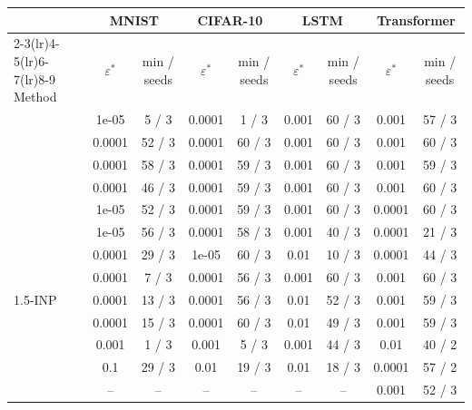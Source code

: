 \begin{tabular}{l cc cc cc cc}
\toprule
 & \multicolumn{2}{c}{MNIST} & \multicolumn{2}{c}{CIFAR-10} & \multicolumn{2}{c}{LSTM} & \multicolumn{2}{c}{Transformer} \\
\cmidrule(lr){2-3}\cmidrule(lr){4-5}\cmidrule(lr){6-7}\cmidrule(lr){8-9}
Method & $\varepsilon^\ast$ & min / seeds & $\varepsilon^\ast$ & min / seeds & $\varepsilon^\ast$ & min / seeds & $\varepsilon^\ast$ & min / seeds \\
\midrule
\BP{} & 1e-05 & 5 / 3 & 0.0001 & 1 / 3 & 0.001 & 60 / 3 & 0.001 & 57 / 3 \\
\SPSA{} & 0.0001 & 52 / 3 & 0.0001 & 60 / 3 & 0.001 & 60 / 3 & 0.001 & 60 / 3 \\
\SPSAb{} & 0.0001 & 58 / 3 & 0.0001 & 59 / 3 & 0.001 & 60 / 3 & 0.001 & 59 / 3 \\
\RS{} & 0.0001 & 46 / 3 & 0.0001 & 59 / 3 & 0.001 & 60 / 3 & 0.001 & 60 / 3 \\
\NP{} & 1e-05 & 52 / 3 & 0.0001 & 59 / 3 & 0.001 & 60 / 3 & 0.0001 & 60 / 3 \\
\ANP{} & 1e-05 & 56 / 3 & 0.0001 & 58 / 3 & 0.001 & 40 / 3 & 0.0001 & 21 / 3 \\
\ANPb{} & 0.0001 & 29 / 3 & 1e-05 & 60 / 3 & 0.01 & 10 / 3 & 0.0001 & 44 / 3 \\
\INP{} & 0.0001 & 7 / 3 & 0.0001 & 56 / 3 & 0.001 & 60 / 3 & 0.001 & 60 / 3 \\
1.5-INP & 0.0001 & 13 / 3 & 0.0001 & 56 / 3 & 0.01 & 52 / 3 & 0.001 & 59 / 3 \\
\DUST{} & 0.0001 & 15 / 3 & 0.0001 & 60 / 3 & 0.01 & 49 / 3 & 0.001 & 59 / 3 \\
\DANP{} & 0.001 & 1 / 3 & 0.001 & 5 / 3 & 0.001 & 44 / 3 & 0.01 & 40 / 2 \\
\FF{} & 0.1 & 29 / 3 & 0.01 & 19 / 3 & 0.01 & 18 / 3 & 0.0001 & 57 / 2 \\
\IPC{} & -- & -- & -- & -- & -- & -- & 0.001 & 52 / 3 \\
\bottomrule
\end{tabular}
